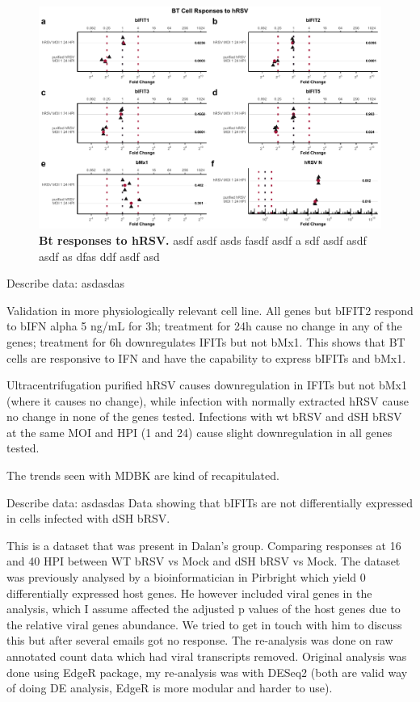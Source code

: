 \begin{figure}
    \centering
    \includegraphics[width=1\linewidth]{07. Chapter 2/Figs/02. Induction/10. bt_hrsv.pdf}
    \caption[Bt responses to hRSV.]{\textbf{Bt responses to hRSV.} asdf asdf asds fasdf asdf a sdf asdf asdf asdf as dfas ddf asdf asd}
    \label{Bt responses to hRSV}
\end{figure}


Describe data: \newline
asdasdas

Validation in more physiologically relevant cell line. All genes but bIFIT2 respond to bIFN alpha 5 ng/mL for 3h; treatment for 24h cause no change in any of the genes; treatment for 6h downregulates IFITs but not bMx1. This shows that BT cells are responsive to IFN and have the capability to express bIFITs and bMx1.

Ultracentrifugation purified hRSV causes downregulation in IFITs but not bMx1 (where it causes no change), while infection with normally extracted hRSV cause no change in none of the genes tested. Infections with wt bRSV and dSH bRSV at the same MOI and HPI (1 and 24) cause slight downregulation in all genes tested.

The trends seen with MDBK are kind of recapitulated.

 \label{Validation by analysing bRSV RNAseq dataset}
Describe data: \newline
asdasdas \newline
Data showing that bIFITs are not differentially expressed in cells infected with dSH bRSV.

This is a dataset that was present in Dalan’s group. Comparing responses at 16 and 40 HPI between WT bRSV vs Mock and dSH bRSV vs Mock. The dataset was previously analysed by a bioinformatician in Pirbright which yield 0 differentially expressed host genes. He however included viral genes in the analysis, which I assume affected the adjusted p values of the host genes due to the relative viral genes abundance. We tried to get in touch with him to discuss this but after several emails got no response. The re-analysis was done on raw annotated count data which had viral transcripts removed. Original analysis was done using EdgeR package, my re-analysis was with DESeq2 (both are valid way of doing DE analysis, EdgeR is more modular and harder to use).

